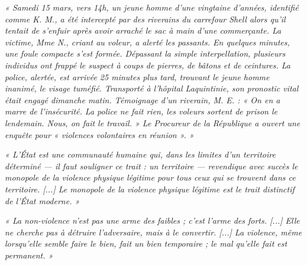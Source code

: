 \documentclass[11pt]{article}
\begin{document}
\begin{exemplebox}
\emph{« Samedi 15 mars, vers 14h, un jeune homme d'une vingtaine d'années, identifié comme K. M., a été intercepté par des riverains du carrefour Shell alors qu'il tentait de s'enfuir après avoir arraché le sac à main d'une commerçante. La victime, Mme N., criant au voleur, a alerté les passants. En quelques minutes, une foule compacte s'est formée. Dépassant la simple interpellation, plusieurs individus ont frappé le suspect à coups de pierres, de bâtons et de ceintures. La police, alertée, est arrivée 25 minutes plus tard, trouvant le jeune homme inanimé, le visage tuméfié. Transporté à l'hôpital Laquintinie, son pronostic vital était engagé dimanche matin. Témoignage d'un riverain, M. E. : « On en a marre de l'insécurité. La police ne fait rien, les voleurs sortent de prison le lendemain. Nous, on fait le travail. » Le Procureur de la République a ouvert une enquête pour « violences volontaires en réunion ». »}
\end{exemplebox}

\begin{exemplebox}
\emph{« L'État est une communauté humaine qui, dans les limites d'un territoire déterminé — il faut souligner ce trait : un territoire — revendique avec succès le monopole de la violence physique légitime pour tous ceux qui se trouvent dans ce territoire. [...] Le monopole de la violence physique légitime est le trait distinctif de l'État moderne. »}
\end{exemplebox}

\begin{exemplebox}
\emph{« La non-violence n'est pas une arme des faibles ; c'est l'arme des forts. [...] Elle ne cherche pas à détruire l'adversaire, mais à le convertir. [...] La violence, même lorsqu'elle semble faire le bien, fait un bien temporaire ; le mal qu'elle fait est permanent. »}
\end{exemplebox}
\end{document}
